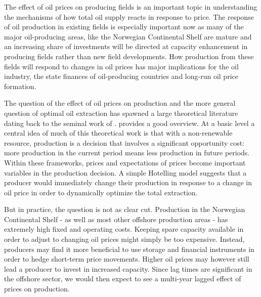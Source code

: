\documentclass[11pt]{article}
\begin{document}

The effect of oil prices on producing fields is an important topic in understanding the mechanisms of how total oil supply reacts in response to price. The response of oil production in existing fields is especially important now as many of the major oil-producing areas, like the Norwegian Continental Shelf are mature and an increasing share of investments will be directed at capacity enhancement in producing fields rather than new field developments. How production from these fields will respond to changes in oil prices has major implications for the oil industry, the state finances of oil-producing countries and long-run oil price formation.

The question of the effect of oil prices on production and the more general question of optimal oil extraction has spawned a large theoretical literature dating back to the seminal work of \citet{hotelling_economics_1931}. \citet{krautkraemer_nonrenewable_1998} provides a good overview. At a basic level a central idea of much of this theoretical work is that with a non-renewable resource, production is a decision that involves a significant opportunity cost: more production in the current period means less production in future periods.  Within these frameworks, prices and expectations of prices become important variables in the production decision. A simple Hotelling model suggests that a producer would immediately change their production in response to a change in oil price in order to dynamically optimize the total extraction.

But in practice, the question is not as clear cut.  Production in the Norwegian Continental Shelf - as well as most other offshore production areas - has extremely high fixed and operating costs.  Keeping spare capacity available in order to adjust to changing oil prices might simply be too expensive.  Instead, producers may find it more beneficial to use storage and financial instruments in order to hedge short-term price movements. Higher oil prices may however still lead a producer to invest in increased capacity.  Since lag times are significant in the offshore sector, we would then expect to see a multi-year lagged effect of prices on production.  
\end{document}
